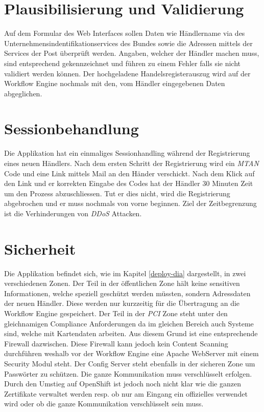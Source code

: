 \section{Plausibilisierung und Validierung}

Auf dem Formular des Web Interfaces sollen Daten wie Händlername via des Unternehmensindentifikationservices des Bundes sowie die Adressen mittels der Services der Post überprüft werden. Angaben, welcher der Händler machen muss, sind entsprechend gekennzeichnet und führen zu einem Fehler falls sie nicht validiert werden können. Der hochgeladene Handelsregisterauszug wird auf der Workflow Engine nochmals mit den, vom Händler eingegebenen Daten abgeglichen.
\newpage
\section{Sessionbehandlung}

Die Applikation hat ein einmaliges Sessionhandling während der Registrierung eines neuen Händlers. Nach dem ersten Schritt der Registrierung wird ein \textit{\gls{MTAN}} Code und eine Link mittels Mail an den Händer verschickt. Nach dem Klick auf den Link und er korrekten Eingabe des Codes hat der Händler 30 Minuten Zeit um den Prozess abzuschliessen.
Tut er dies nicht, wird die Registrierung abgebrochen und er muss nochmals von vorne beginnen. Ziel der Zeitbegrenzung ist die Verhinderungen von \textit{\gls{DDoS}} Attacken.

\section{Sicherheit}

Die Applikation befindet sich, wie im Kapitel \ref{deploy-dia} dargestellt, in zwei verschiedenen Zonen. Der Teil in der öffentlichen Zone hält keine sensitiven Informationen, welche speziell geschützt werden müssten, sondern Adressdaten der neuen Händler. Diese werden nur kurzzeitig für die Übertragung an die Workflow Engine gespeichert. Der Teil in der \textit{\gls{PCI}} Zone steht unter den gleichnamigen Compliance Anforderungen da im gleichen Bereich auch Systeme sind, welche mit Kartendaten arbeiten. Aus diesem Grund ist eine entsprechende Firewall dazwischen. Diese Firewall kann jedoch kein Content Scanning durchführen weshalb vor der Workflow Engine eine Apache WebServer mit einem Security Modul steht. Der Config Server steht ebenfalls in der sicheren Zone um Passwörter zu schützen. Die ganze Kommunikation muss verschlüsselt erfolgen. Durch den Umstieg auf OpenShift ist jedoch noch nicht klar wie die ganzen Zertifikate verwaltet werden resp. ob nur am Eingang ein offizielles verwendet wird oder ob die ganze Kommunikation verschlüsselt sein muss.

